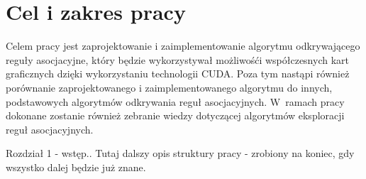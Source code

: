 \section{Cel i zakres pracy}
Celem pracy jest zaprojektowanie i zaimplementowanie algorytmu odkrywającego reguły asocjacyjne, który będzie wykorzystywał możliwośći współczesnych kart graficznych dzięki wykorzystaniu technologii CUDA. Poza tym nastąpi również porównanie zaprojektowanego i zaimplementowanego algorytmu do innych, podstawowych algorytmów odkrywania reguł asocjacyjnych. W~ramach pracy dokonane zostanie również zebranie wiedzy dotyczącej algorytmów eksploracji reguł asocjacyjnych.

Rozdział 1 - wstęp.. Tutaj dalszy opis struktury pracy - zrobiony na koniec, gdy wszystko dalej będzie już znane.